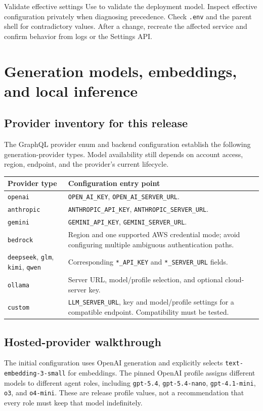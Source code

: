 \documentclass[11pt,letterpaper]{article}
\newcommand{\code}[1]{\nolinkurl{#1}}
\newcommand{\src}[1]{\cite{#1}}
\begin{document}
\begin{panel}{Validate effective settings}
Use \texttt{} to validate the deployment model. Inspect effective
configuration privately when diagnosing precedence. Check \code{.env} and the
parent shell for contradictory values. After a change, recreate the affected
service and confirm behavior from logs or the Settings API.
\end{panel}

\clearpage
\section{Generation models, embeddings, and local inference}
\label{sec:providers}
\subsection{Provider inventory for this release}
The GraphQL provider enum and backend configuration establish the following
generation-provider types. Model availability still depends on account access,
region, endpoint, and the provider's current lifecycle. \src{graphql,config}

\begin{tabularx}{\textwidth}{@{}L{0.25\textwidth}Y@{}}
\toprule
\textbf{Provider type} & \textbf{Configuration entry point}\\
\midrule
\code{openai} & \code{OPEN_AI_KEY}, \code{OPEN_AI_SERVER_URL}.\\
\code{anthropic} & \code{ANTHROPIC_API_KEY}, \code{ANTHROPIC_SERVER_URL}.\\
\code{gemini} & \code{GEMINI_API_KEY}, \code{GEMINI_SERVER_URL}.\\
\code{bedrock} & Region and one supported AWS credential mode; avoid configuring
multiple ambiguous authentication paths.\\
\code{deepseek}, \code{glm}, \code{kimi}, \code{qwen} &
Corresponding \code{*_API_KEY} and \code{*_SERVER_URL} fields.\\
\code{ollama} & Server URL, model/profile selection, and optional cloud-server key.\\
\code{custom} & \code{LLM_SERVER_URL}, key and model/profile settings for a
compatible endpoint. Compatibility must be tested.\\
\bottomrule
\end{tabularx}

\subsection{Hosted-provider walkthrough}
The initial configuration uses OpenAI generation and explicitly selects
\code{text-embedding-3-small} for embeddings. The pinned OpenAI profile assigns
different models to different agent roles, including \code{gpt-5.4},
\code{gpt-5.4-nano}, \code{gpt-4.1-mini}, \code{o3}, and \code{o4-mini}.
These are release profile values, not a recommendation that every role must keep
that model indefinitely. \src{openai-profile,openai-embedding}
\end{document}
